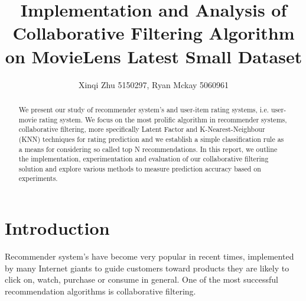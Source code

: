 \documentclass[10pt]{article}
\title{Implementation and Analysis of Collaborative Filtering Algorithm on MovieLens Latest Small Dataset}
\author{Xinqi Zhu 5150297, Ryan Mckay 5060961}
\begin{document}
 

\maketitle


\begin{abstract}
We present our study of recommender system's and user-item rating systems, i.e. user-movie rating system. We focus on the most prolific algorithm in recommender systems, collaborative filtering, more specifically Latent Factor and K-Nearest-Neighbour (KNN) techniques for rating prediction and we establish a simple classification rule as a means for considering so called top N recommendations. In this report, we outline the implementation, experimentation and evaluation of our collaborative filtering solution and explore various methods to measure prediction accuracy based on experiments.
\end{abstract}



\section{Introduction}

Recommender system's have become very popular in recent times, implemented by many Internet giants to guide customers toward products they are likely to click on, watch, purchase or consume in general. One of the most successful recommendation algorithms is collaborative filtering.
\end{document}
